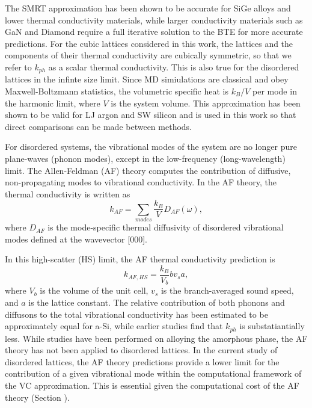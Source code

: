 \documentclass[aps,prb,onecolumn,preprint,superscriptaddress,amsmath,amssymb,floatfix]{revtex4}
\begin{document}
The SMRT approximation has been shown to be accurate for SiGe alloys  
and lower thermal conductivity materials, while larger conductivity 
materials such as GaN and Diamond require a full 
iterative solution to the BTE for more accurate predictions.
\cite{garg_role_2011,lindsay_thermal_2012,ward_intrinsic_2010} 
For the cubic lattices considered in this 
work, the lattices and the components of their 
thermal conductivity are cubically symmetric, so that we refer to 
$k_{ph}$ as a scalar thermal conductivity. 
This is also true for the disordered lattices 
in the infinte size limit. 
Since MD simiulations are classical 
and obey Maxwell-Boltzmann 
statistics,\cite{mcquarrie_statistical_2000} the volumetric 
specific heat is $k_{B}/V$ per mode in the harmonic limit, where $V$ 
is the system volume. This approximation has been shown to be valid 
for LJ argon and SW silicon and is used 
in this work so that direct comparisons can be made between methods.
\cite{larkin_comparison_2012}

For disordered systems, the vibrational modes of the system are no 
longer pure plane-waves (phonon modes), except in the low-frequency 
(long-wavelength) limit. The Allen-Feldman (AF) theory computes 
the contribution of diffusive, non-propagating modes to vibrational 
conductivity.\cite{allen_thermal_1993} 
In the AF theory, the thermal conductivity is written as
\begin{equation}\label{EQ:M:k_AF}
k_{AF} = \sum_{modes} \frac{k_{B}}{V} D_{AF}(\omega),
\end{equation}
where $D_{AF}$ is the mode-specific thermal diffusivity of  
disordered vibrational modes defined at the wavevector [000].   

In this high-scatter (HS) limit, 
the AF thermal conductivity prediction is
\begin{equation}\label{EQ:M:k_AF,HS}
k_{AF,HS} = \frac{k_{B}}{V_b}b v_s a,
\end{equation}
where $V_b$ is the volume of the unit cell, $v_s$ is the 
branch-averaged sound speed, and $a$ is the lattice constant.
\cite{cahill_lattice_1988} The relative contribution of both
phonons and diffusons to the total vibrational 
conductivity has been estimated 
to be approximately equal for a-Si,\cite{he_heat_2011} while earlier 
studies find that $k_{ph}$ is substatiantially less.
\cite{feldman_numerical_1999} 
While studies have been performed on alloying the amorphous phase, the 
AF theory has not been applied to disordered lattices.
\cite{feldman_thermal_1993} 
In the current study of disordered lattices, 
the AF theory predictions provide a lower limit for the contribution 
of a given vibrational mode within the computational 
framework of the VC approximation. This is essential given 
the computational cost of the AF theory (Section ).
\end{document}
